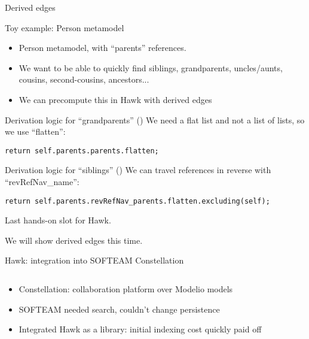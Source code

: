 \begin{frame}[fragile]{Derived edges}
  \begin{block}{Toy example: Person metamodel}
    \begin{itemize}
    \item Person metamodel, with ``parents'' references.
    \item We want to be able to quickly find siblings, grandparents,
      uncles/aunts, cousins, second-cousins, ancestors...
    \item We can precompute this in Hawk with \alert{derived edges}
    \end{itemize}
  \end{block}

  \begin{block}{Derivation logic for ``grandparents'' ()}
    \vspace{.3em}
    We need a flat list and not a list of lists, so we use ``flatten'':
    \begin{lstlisting}[language=EOL]
      return self.parents.parents.flatten;
    \end{lstlisting}
  \end{block}

  \begin{block}{Derivation logic for ``siblings'' ()}
    \vspace{.3em}
    We can travel references in reverse with ``revRefNav\_name'':

    \begin{lstlisting}[language=EOL]
      return self.parents.revRefNav_parents.flatten.excluding(self);
    \end{lstlisting}
  \end{block}

\end{frame}

\begin{frame}[standout]
  Last hands-on slot for Hawk.

  We will show derived edges this time.
\end{frame}

\begin{frame}{Hawk: integration into SOFTEAM Constellation~\cite{hawkmodelio_2016}}

  \centering
  \begin{columns}
    

    
  \end{columns}

  \begin{itemize}
  \item Constellation: collaboration platform over Modelio models
  \item SOFTEAM needed search, couldn't change persistence
  \item Integrated Hawk as a library: initial indexing cost quickly paid off
  \end{itemize}
\end{frame}

